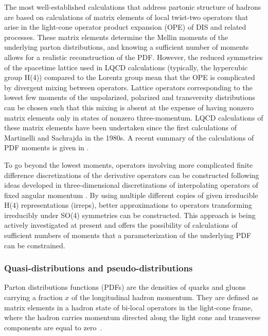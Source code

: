 The most well-established calculations that address partonic structure of hadrons are based on calculations of matrix elements of local twist-two operators that arise in the light-cone operator product expansion (OPE) of DIS and related processes. These matrix elements determine the Mellin moments of the underlying parton distributions, and knowing a sufficient number of moments allows for a realistic reconstruction of the PDF. However, the reduced symmetries of the spacetime lattice used in LQCD calculations (typically, the hypercubic group H(4)) compared to the Lorentz group mean that the OPE is complicated by divergent mixing between operators.
Lattice operators corresponding to the lowest few moments of the unpolarized, polarized and transversity distributions can be chosen such that this mixing is absent at the expense of having nonzero matrix elements only in states of nonzero three-momentum. LQCD calculations of these matrix elements have been undertaken since the first calculations of Martinelli and Sachrajda \cite{Dawson:1997ic} in the 1980s. A recent summary of the calculations of PDF moments is given in \cite{Lin:2017snn}.
	
To go beyond the lowest moments, operators involving more complicated finite difference discretizations of the derivative operators can be constructed following ideas developed in three-dimensional discretizations of interpolating operators of fixed angular momentum \cite{}. By using multiple different copies of given irreducible H(4) representations (irreps), better approximations to operators transforming irreducibly under SO(4) symmetries can be constructed. This approach is being actively investigated at present and offers the possibility of calculations of sufficient numbers of moments that a parameterization of the underlying PDF can be constrained.



\subsubsection{Quasi-distributions and pseudo-distributions}


Parton distributions functions (PDFs)  are the densities 
of quarks and gluons carrying a fraction $x$ of the longitudinal hadron momentum.
They  are defined as matrix 
elements in a hadron state of bi-local operators in the light-cone frame, where 
the hadron carries momentum directed along the light cone and
transverse components are equal to zero~\cite{Collins:1981uw,Curci:1980uw,Baulieu:1979mr,Collins:1989gx}.
 

